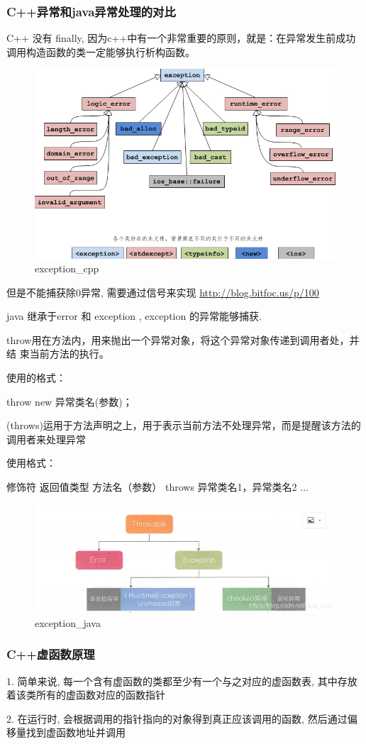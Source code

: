 \documentclass[UTF8]{ctexart}
\begin{document}
\subsubsection{C++异常和java异常处理的对比}
C++ 没有 finally, 因为c++中有一个非常重要的原则，就是：在异常发生前成功调用构造函数的类一定能够执行析构函数。

\begin{figure}
	\centering
	\includegraphics[width=0.7\linewidth]{figures/exceptioncpp.png}
	\caption{exception\_cpp}
	\label{fig:exception_cpp}
\end{figure}
但是不能捕获除0异常, 需要通过信号来实现 \url{http://blog.bitfoc.us/p/100}

java 继承于error 和  exception , exception 的异常能够捕获.

throw用在方法内，用来抛出一个异常对象，将这个异常对象传递到调用者处，并结 束当前方法的执行。

使用的格式：

throw new 异常类名(参数)；


(throws)运用于方法声明之上，用于表示当前方法不处理异常，而是提醒该方法的调用者来处理异常

使用格式：

修饰符 返回值类型 方法名（参数） throws 异常类名1，异常类名2 ... { }
\begin{figure}
	\centering
	\includegraphics[width=0.7\linewidth]{figures/exceptionjava.png}
	\caption{exception\_java}
	\label{fig:exception_java}
\end{figure}


\subsubsection{C++虚函数原理}
1. 简单来说, 每一个含有虚函数的类都至少有一个与之对应的虚函数表, 其中存放着该类所有的虚函数对应的函数指针 \par
2. 在运行时, 会根据调用的指针指向的对象得到真正应该调用的函数, 然后通过偏移量找到虚函数地址并调用 \par
\end{document}
